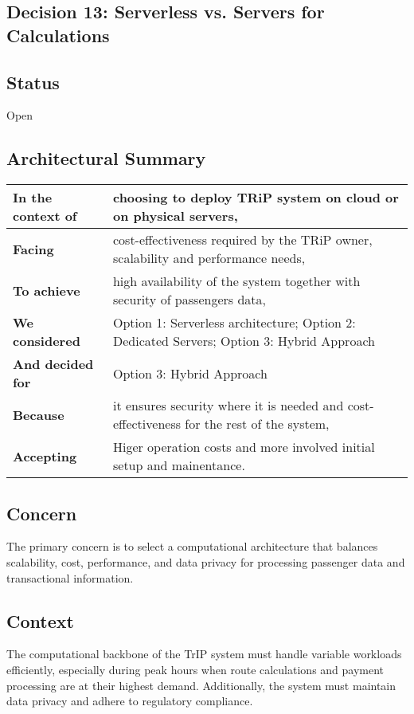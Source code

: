 \subsection{Decision 13: Serverless vs. Servers for Calculations}

\subsection*{Status}
Open

\subsection*{Architectural Summary}
\begin{tabular}{|p{3.5cm}|p{10.5cm}|}
    \hline
    \textbf{In the context of} & choosing to deploy TRiP system on cloud or on physical servers, \\
    \hline
    \textbf{Facing} & cost-effectiveness required by the TRiP owner, scalability and performance needs, \\
    \hline
    \textbf{To achieve} & high availability of the system together with security of passengers data, \\
    \hline
    \textbf{We considered} & Option 1: Serverless architecture; Option 2: Dedicated Servers; Option 3: Hybrid Approach\\
    \hline
    \textbf{And decided for} & Option 3: Hybrid Approach \\
    \hline
    \textbf{Because} & it ensures security where it is needed and cost-effectiveness for the rest of the system, \\
    \hline
    \textbf{Accepting} & Higer operation costs and more involved initial setup and mainentance. \\
    \hline
\end{tabular}
\subsection*{Concern}
The primary concern is to select a computational architecture that balances scalability, cost, performance, and data privacy for processing passenger data and transactional information.

\subsection*{Context}
The computational backbone of the TrIP system must handle variable workloads efficiently, especially during peak hours when route calculations and payment processing are at their highest demand. Additionally, the system must maintain data privacy and adhere to regulatory compliance.

